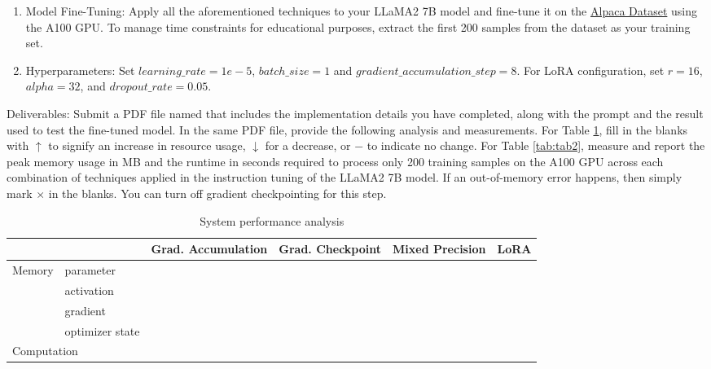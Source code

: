 \begin{enumerate}
\item Model Fine-Tuning: Apply all the aforementioned techniques to your LLaMA2 7B model and fine-tune it on the \href{https://github.com/tatsu-lab/stanford_alpaca/blob/main/alpaca_data.json}{Alpaca Dataset} using the A100 GPU. To manage time constraints for educational purposes, extract the first 200 samples from the dataset as your training set.
\item Hyperparameters: Set $learning\_rate=1e-5$, $batch\_size=1$ and $gradient\_accumulation\_step=8$. For LoRA configuration, set $r=16$, $alpha=32$, and $dropout\_rate=0.05$.
\end{enumerate}

Deliverables: Submit a PDF file named  that includes the implementation details you have completed, along with the prompt and the result used to test the fine-tuned model.
In the same PDF file, provide the following analysis and measurements. For Table \ref{tab:tab1}, fill in the blanks with $\uparrow$ to signify an increase in resource usage, $\downarrow$ for a decrease, or $-$ to indicate no change. For Table \ref{tab:tab2}, measure and report the peak memory usage in MB and the runtime in seconds required to process only 200 training samples on the A100 GPU across each combination of techniques applied in the instruction tuning of the LLaMA2 7B model. If an out-of-memory error happens, then simply mark $\times$ in the blanks. You can turn off gradient checkpointing for this step.


\begin{table}[h]
\centering
\begin{tabular}{l|l|l|l|l|l}
\hline
\multicolumn{1}{l|}{}                       &                 & Grad. Accumulation & Grad. Checkpoint & Mixed Precision & LoRA \\ \hline
\multicolumn{1}{l|}{\multirow{4}{*}{Memory}}& parameter       &    &    &    &      \\ \cline{2-6} 
\multicolumn{1}{l|}{}                       & activation      &    &    &    &      \\ \cline{2-6} 
\multicolumn{1}{l|}{}                       & gradient        &    &    &    &      \\ \cline{2-6} 
\multicolumn{1}{l|}{}                       & optimizer state &    &    &    &      \\ \hline
\multicolumn{2}{l|}{Computation}                              &    &    &    &      \\ \hline
\end{tabular}
\caption{System performance analysis}
\label{tab:tab1}
\end{table}

